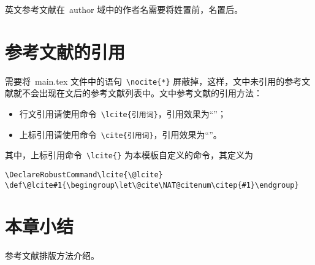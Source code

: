 英文参考文献在~author 域中的作者名需要将姓置前，名置后。

\section{参考文献的引用}

需要将~main.tex 文件中的语句~\verb|\nocite{*}| 屏蔽掉，这样，文中未引用的参考文献就不会出现在文后的参考文献列表中。文中参考文献的引用方法：

\begin{itemize}
\item 行文引用请使用命令~\verb|\lcite{引用词}|，引用效果为“”；
\item 上标引用请使用命令~\verb|\cite{引用词}|，引用效果为“\cite{OJP1999}”。
\end{itemize}
其中，上标引用命令~\verb|\lcite{}| 为本模板自定义的命令，其定义为
\begin{verbatim}
\DeclareRobustCommand\lcite{\@lcite}
\def\@lcite#1{\begingroup\let\@cite\NAT@citenum\citep{#1}\endgroup}
\end{verbatim}

\section*{本章小结}
参考文献排版方法介绍。
